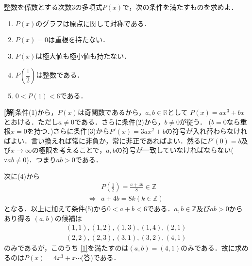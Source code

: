 \documentclass[a4j]{jarticle}
\begin{document}

     \begin{oframed}
     整数を係数とする次数$3$の多項式$P(x)$で，次の条件を満たすものを求めよ．
          \begin{enumerate}[(1)]
          \item $P(x)$のグラフは原点に関して対称である．
          \item $P(x)=0$は重根を持たない．
          \item $P(x)$は極大値も極小値も持たない．
          \item $P\left(\dfrac{1}{2}\right)$は整数である．
          \item $0<P(1)<6$である．
          \end{enumerate}
     \end{oframed}

\setlength{\columnseprule}{0.4pt}
\begin{multicols}{2}
{\bf[解]}条件(1)から，$P(x)$は奇関数であるから，$a,b\in\mathbb{R}$として
$P(x)=ax^3+bx$とおける．ただし$a\not=0$である．さらに条件(2)から，$b\not=0$が従う．
($b=0$なら重根$x=0$を持つ．)さらに条件(3)から$P'(x)=3ax^2+b$の符号が入れ替わらなければよい．言い換えれば常に非負か，常に非正であればよい．然るに$P'(0)=b$及び$x\to\infty$の極限を考えることで，$a,b$の符号が一致していなければならない($\because ab\not=0$)．つまり$ab>0$である．

次に(4)から
      \begin{align}
      &P\left(\frac{1}{2}\right)=\frac{a+4b}{8}\in\mathbb{Z} \nonumber\\
      \Longleftrightarrow&a+4b=8k(k\in\mathbb{Z})\label{1}
      \end{align}
となる．以上に加えて条件(5)から$0<a+b<6$である．$a,b\in\mathbb{Z}$及び$ab>0$からあり得る
$(a,b)$の候補は
     \begin{align*}
     (1,1),(1,2),(1,3),(1,4),(2,1)  \\
     (2,2),(2,3),(3,1),(3,2),(4,1)
     \end{align*}
のみであるが，このうち
\eqref{1}を満たすのは$(a,b)=(4,1)$のみである．故に求めるのは$P(x)=4x^3+x\cdots$(答)である．  
\newpage
\end{multicols}
\end{document}
